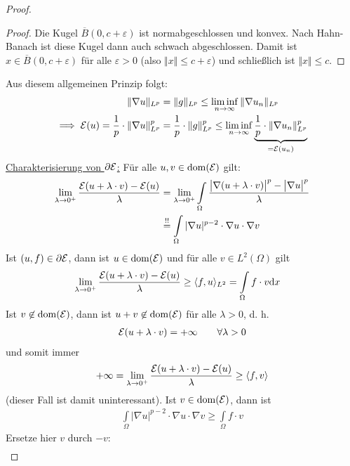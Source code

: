 \begin{beispiel}
\begin{proof}
		\begin{proof}
			Die Kugel $\overline{B}(0,c+\varepsilon)$ ist normabgeschlossen und konvex. Nach Hahn-Banach ist diese Kugel dann auch schwach abgeschlossen.
			Damit ist $x\in\overline{B}(0,c+\varepsilon)$ für alle $\varepsilon>0$ (also $\Vert x\Vert\leq c+\varepsilon$) und schließlich ist $\Vert x\Vert\leq c$.
		\end{proof}
		Aus diesem allgemeinen Prinzip folgt:
		\begin{align*}
			\Vert\nabla u\Vert_{L^p}&=\Vert g\Vert_{L^p}\leq\liminf\limits_{n\to\infty}\Vert \nabla u_n\Vert_{L^p}\\
			\implies
			\mathcal{E}(u)=\frac{1}{p}\cdot\Vert\nabla u\Vert_{L^p}^p&=\frac{1}{p}\cdot\Vert g\Vert_{L^p}^p\leq\liminf\limits_{n\to\infty}\underbrace{\frac{1}{p}\cdot\Vert \nabla u_n\Vert_{L^p}^p}_{=\mathcal{E}(u_n)}
		\end{align*}
		\underline{Charakterisierung von $\partial\mathcal{E}$:} 
		Für alle $u,v\in\operatorname{dom}(\mathcal{E})$ gilt:
		\begin{align*}
			\lim\limits_{\lambda\to 0^+}\frac{\mathcal{E}(u+\lambda\cdot v)-\mathcal{E}(u)}{\lambda}&=\lim\limits_{\lambda\to 0^+}\int\limits_\Omega\frac{\big|\nabla(u+\lambda\cdot v)\big|^p-\big|\nabla u\big|^p}{\lambda}\\
			&\overset{!!}{=}
			\int\limits_\Omega|\nabla u|^{p-2}\cdot\nabla u\cdot\nabla v
		\end{align*}
		Ist $(u,f)\in\partial\mathcal{E}$, dann ist $u\in\operatorname{dom}(\mathcal{E})$ und für alle $v\in L^2(\Omega)$ gilt
		\begin{align*}
			\lim\limits_{\lambda\to 0^+}\frac{\mathcal{E}(u+\lambda\cdot v)-\mathcal{E}(u)}{\lambda}&\geq\langle f,u\rangle_{L^2}
			=\int\limits_\Omega f\cdot v\mathrm{d} x
		\end{align*}
		Ist $v\not\in\operatorname{dom}(\mathcal{E})$, dann ist $u+v\not\in\operatorname{dom}(\mathcal{E})$ für alle $\lambda>0$, d. h.
		\begin{align*}
			\mathcal{E}(u+\lambda\cdot v)=+\infty\qquad\forall\lambda>0
		\end{align*}
		und somit immer
		\begin{align*}
			+\infty=\lim\limits_{\lambda\to 0^+}\frac{\mathcal{E}(u+\lambda\cdot v)-\mathcal{E}(u)}{\lambda}\geq\langle f,v\rangle
		\end{align*}
		(dieser Fall ist damit uninteressant). Ist $v\in\operatorname{dom}(\mathcal{E})$, dann ist 
		\begin{align*}
			\int\limits_\Omega |\nabla u|^{p-2}\cdot\nabla u\cdot\nabla v\geq\int\limits_\Omega f\cdot v
		\end{align*}
		Ersetze hier $v$ durch $-v$:
		\begin{align*}

\end{align*}
\end{proof}
\end{beispiel}
